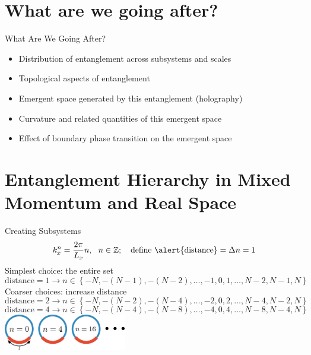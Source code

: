 \documentclass[12pt,aspectratio=169]{beamer}
\begin{document}
\section{What are we going after?}

\begin{frame}{What Are We Going After?}
	\begin{itemize}
		\item Distribution of entanglement across subsystems and scales\\[10pt]
		\item Topological aspects of entanglement\\[10pt]
		\item Emergent space generated by this entanglement (\alert{holography})\\[10pt]
		\item Curvature and related quantities of this emergent space\\[10pt]
		\item Effect of boundary phase transition on the emergent space
	\end{itemize}

\end{frame}

\section{Entanglement Hierarchy in Mixed Momentum and Real Space}

\begin{frame}{Creating Subsystems}
	\[k_x^n = \frac{2\pi }{L_x} n,~ ~ n \in \mathbb{Z};~~~ \text{define \alert{distance}} = \Delta n = 1\]
	\alert{Simplest} choice: the entire set
	\[\text{distance} = 1 \longrightarrow n \in \left\{-N,-(N-1),-(N-2),\ldots,-1,0,1,\ldots,N-2,N-1,N\right\} \]
	\alert{Coarser} choices: increase distance
	\[\text{distance} = 2 \longrightarrow n \in \left\{-N,-(N-2),-(N-4),\ldots,-2,0,2,\ldots,N-4,N-2,N\right\} \]
	\[\text{distance} = 4 \longrightarrow n \in \left\{-N,-(N-4),-(N-8),\ldots,-4,0,4,\ldots,N-8,N-4,N\right\} \]
	\centering
	\vspace*{\fill}
	\includegraphics[width=0.4\textwidth]{figures/A_mi.pdf}
\end{frame}
\end{document}
